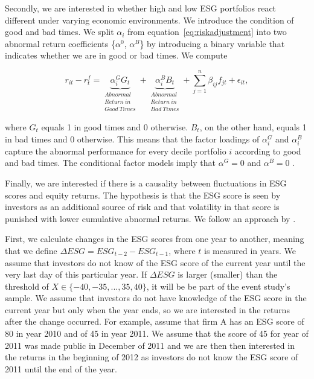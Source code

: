 \documentclass[11pt]{article}
\begin{document}
Secondly, we are interested in whether high and low ESG portfolios react different under varying economic environments. We introduce the condition of good and bad times. We split $\alpha_i$ from equation~\eqref{eq:riskadjustment} into two abnormal return coefficients \{$\alpha^0$, $\alpha^B$\} by introducing a binary variable that indicates whether we are in good or bad times. We compute 

\begin{equation}
\label{eq:goodandbadtimes}
r_{it} - r_t^f = 
	\underbrace{\alpha_i^{G} G_t}_{\substack{Abnormal\\Return~in\\Good~Times}} + 
	\underbrace{\alpha_i^{B} B_t}_{\substack{Abnormal\\Return~in\\Bad~Times}}  
	+ \sum_{j=1}^{n} \beta_{ij} f_{jt} + \epsilon_{it},
\end{equation}

where $G_t$ equals 1 in good times and 0 otherwise. $B_t$, on the other hand, equals 1 in bad times and 0 otherwise. This means that the factor loadings of $\alpha_i^{G}$ and $\alpha_i^{B}$ capture the abnormal performance for every decile portfolio $i$ according to good and bad times. The conditional factor models imply that $\alpha^G = 0$ and $\alpha^B = 0$ \citep[see, for example,][for similar applications]{Ferson2009, Christopherson1998}.



Finally, we are interested if there is a causality between fluctuations in ESG scores and equity returns. The hypothesis is that the ESG score is seen by investors as an additional source of risk and that volatility in that score is punished with lower cumulative abnormal returns. We follow an approach by \citet{Campbell1997}.

First, we calculate changes in the ESG scores from one year to another, meaning that we define $\Delta ESG = ESG_{t-2} - ESG_{t-1}$, where $t$ is measured in years. We assume that investors do not know of the ESG score of the current year until the very last day of this particular year. If $\Delta ESG$ is larger (smaller) than the threshold of $X \in \{ -40, -35, ..., 35, 40\}$, it will be be part of the event study's sample. We assume that investors do not have knowledge of the ESG score in the current year but only when the year ends, so  we are interested in the returns after the change occurred. For example, assume that firm A has an ESG score of 80 in year 2010 and of 45 in year 2011. We assume that the score of 45 for year of 2011 was made public in December of 2011 and we are then then interested in the returns in the beginning of 2012 as investors do not know the ESG score of 2011 until the end of the year.
\end{document}
